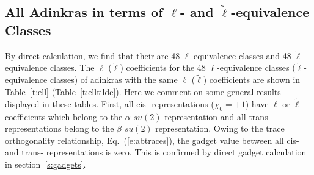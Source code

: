 \subsection{All Adinkras in terms of $\ell$- and $\tilde{\ell}$-equivalence Classes}
By direct calculation, we find that their are 48 $\ell$-equivalence classes and 48 $\tilde{\ell}$-equivalence classes.
The $\ell$ ($\tilde{\ell}$) coefficients for the 48 $\ell$-equivalence classes ($\tilde{\ell}$-equivalence classes) of adinkras with the same $\ell$  ($\tilde{\ell}$)  coefficients are shown in Table~\ref{t:ell} (Table~\ref{t:elltilde}). Here we comment on some general results displayed in these tables. First, all cis- representations ($\chi_0 = +1$) have $\ell$ or $\tilde{\ell}$ coefficients which belong to the $\alpha$ $su(2)$ representation and all trans-representations belong to the $\beta$ $su(2)$ representation. Owing to the trace orthogonality relationship, Eq.~(\ref{e:abtraces}), the gadget value between all cis- and trans- representations is zero. This is confirmed by direct gadget calculation in section~\ref{s:gadgets}.
